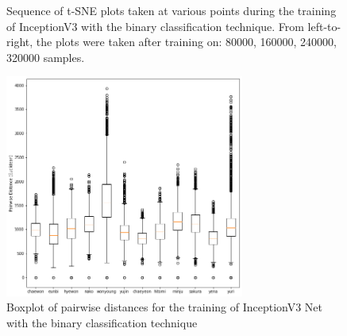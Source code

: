 \begin{enumerate}[left=0pt]
\begin{figure}[htbp]
    \caption{
        Sequence of t-SNE plots taken at various points during the training of InceptionV3 with the binary classification technique.
        From left-to-right, the plots were taken after training on: 80000, 160000, 240000, 320000 samples.
    }
    \label{Figure:Face-Recognition:Results:inceptionv3-and-binary-tsne-sequence}
\end{figure}

\begin{figure}[htbp]
    \centering
    \includegraphics[width=0.7\textwidth]{images/faceReco/inceptionv3-and-binary/boxplot}
    \caption{Boxplot of pairwise distances for the training of InceptionV3 Net with the binary classification technique}
    \label{Figure:Face-Recognition:Results:inceptionv3-and-binary-boxplot}
\end{figure}


\end{enumerate}


